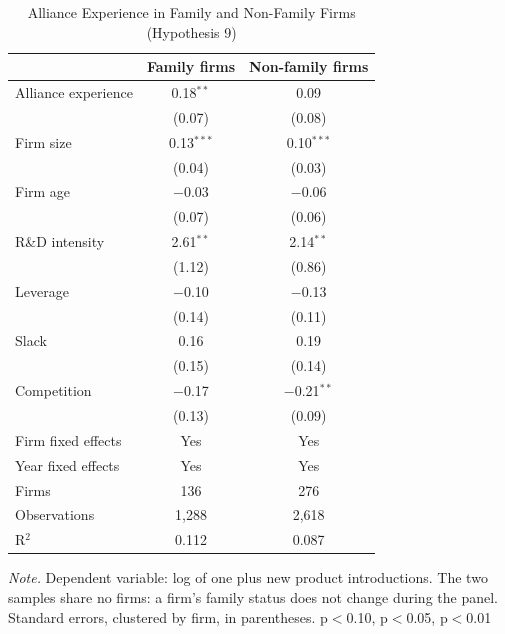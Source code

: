 \documentclass[12pt]{article}
\begin{document}
\begin{table}[p]
\centering\small
\caption{Alliance Experience in Family and Non-Family Firms (Hypothesis 9)}
\begin{tabular}{lcc}
\toprule
 & Family firms & Non-family firms \\
\midrule
Alliance experience & 0.18$^{**}$ & 0.09 \\
 & (0.07) & (0.08) \\[2pt]
Firm size & 0.13$^{***}$ & 0.10$^{***}$ \\
 & (0.04) & (0.03) \\[2pt]
Firm age & $-$0.03 & $-$0.06 \\
 & (0.07) & (0.06) \\[2pt]
R\&D intensity & 2.61$^{**}$ & 2.14$^{**}$ \\
 & (1.12) & (0.86) \\[2pt]
Leverage & $-$0.10 & $-$0.13 \\
 & (0.14) & (0.11) \\[2pt]
Slack & 0.16 & 0.19 \\
 & (0.15) & (0.14) \\[2pt]
Competition & $-$0.17 & $-$0.21$^{**}$ \\
 & (0.13) & (0.09) \\[2pt]
\midrule
Firm fixed effects & Yes & Yes \\
Year fixed effects & Yes & Yes \\
Firms & 136 & 276 \\
Observations & 1,288 & 2,618 \\
R$^2$ & 0.112 & 0.087 \\
\bottomrule
\end{tabular}
\begin{minipage}{0.92\textwidth}\footnotesize\smallskip
\textit{Note.} Dependent variable: log of one plus new product introductions. The two samples share no firms: a firm's family status does not change during the panel. Standard errors, clustered by firm, in parentheses. \textasteriskcentered{} p$<$0.10, \textasteriskcentered{}\textasteriskcentered{} p$<$0.05, \textasteriskcentered{}\textasteriskcentered{}\textasteriskcentered{} p$<$0.01
\end{minipage}
\end{table}
\clearpage
\end{document}
